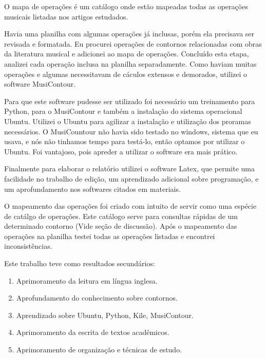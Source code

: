 \documentclass[11pt]{article}
\begin{document}
O mapa de operações é um catálogo onde estão mapeadas todas as
operações musicais listadas nos artigos estudados.

Havia uma planilha com algumas operações já inclusas, porém ela
precisava ser revisada e formatada.  Eu procurei operações de
contornos relacionadas com obras da literatura musical e adicionei ao
mapa de operações.
Concluído esta etapa, analizei cada operação inclusa na
planilha separadamente. Como haviam muitas operações e algumas
necessitavam de cáculos extensos e demorados, utilizei o software
MusiContour.

Para que este software pudesse ser utilizado foi necessário um
treinamento para Python, para o MusiContour e também a instalação do
sistema operacional Ubuntu. Utilizei o Ubuntu para agilizar a
instalação e utilização dos proramas necessários. O MusiCountour não
havia sido testado no windows, sistema que eu usava, e nós não
tinhamos tempo para testá-lo, então optamos por utilizar o Ubuntu. Foi
vantajoso, pois apreder a utilizar o software era mais prático.

Finalmente para elaborar o relatório utilizei o software Latex, que
permite uma facilidade no trabalho de edição, um aprendizado adicional
sobre programação, e um aprofundamento nos softwares citados em
materiais.

\label{sec:resultados}


O mapeamento das operações foi criado com intuito de servir como uma
espécie de catálgo de operações. Este catálogo serve para consultas
rápidas de um determinado contorno (Vide seção de discussão).
Após o mapeamento das operações na planilha testei todas as operações
listadas e encontrei inconsistências.

Este trabalho teve como resultados secundários:

\begin{enumerate}
\item Aprimoramento da leitura em língua inglesa.
\item Aprofundamento do conhecimento sobre contornos.
\item Aprendizado sobre Ubuntu, Python, Kile, MusiContour.
\item Aprimoramento da escrita de textos acadêmicos.
\item Aprimoramento de organização e técnicas de estudo.
\end{enumerate}
\end{document}
